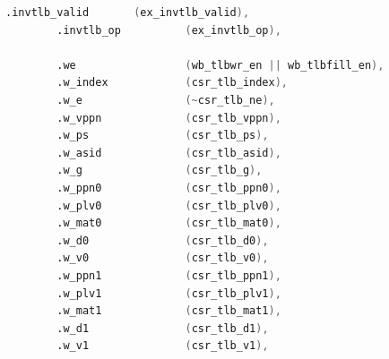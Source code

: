\documentclass[11pt]{article}
\begin{document}
\begin{enumerate}
\begin{lstlisting}[language=verilog]
        .invtlb_valid       (ex_invtlb_valid),
        .invtlb_op          (ex_invtlb_op),

        .we                 (wb_tlbwr_en || wb_tlbfill_en),
        .w_index            (csr_tlb_index),
        .w_e                (~csr_tlb_ne),
        .w_vppn             (csr_tlb_vppn),
        .w_ps               (csr_tlb_ps),
        .w_asid             (csr_tlb_asid),
        .w_g                (csr_tlb_g),
        .w_ppn0             (csr_tlb_ppn0),
        .w_plv0             (csr_tlb_plv0),
        .w_mat0             (csr_tlb_mat0),
        .w_d0               (csr_tlb_d0),
        .w_v0               (csr_tlb_v0),
        .w_ppn1             (csr_tlb_ppn1),
        .w_plv1             (csr_tlb_plv1),
        .w_mat1             (csr_tlb_mat1),
        .w_d1               (csr_tlb_d1),
        .w_v1               (csr_tlb_v1),


\end{lstlisting}
\end{enumerate}
\end{document}
